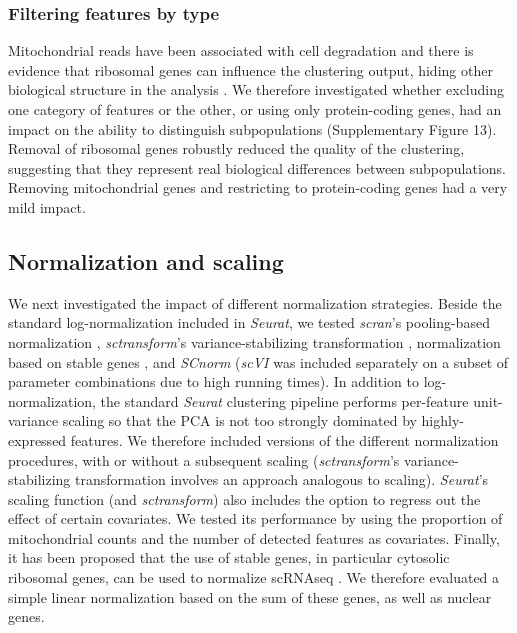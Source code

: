 \documentclass{bmcart}
\begin{document}
\subsubsection*{Filtering features by type}

Mitochondrial reads have been associated with cell degradation and there is evidence that ribosomal genes can influence the clustering output, hiding other biological structure in the analysis \cite{freytagComparison2018}. We therefore investigated whether excluding one category of features or the other, or using only protein-coding genes, had an impact on the ability to distinguish subpopulations (Supplementary Figure 13). Removal of ribosomal genes robustly reduced the quality of the clustering, suggesting that they represent real biological differences between subpopulations. Removing mitochondrial genes and restricting to protein-coding genes had a very mild impact.

\subsection*{Normalization and scaling}

We next investigated the impact of different normalization strategies. Beside the standard log-normalization included in \textit{Seurat}, we tested \textit{scran}'s pooling-based normalization \cite{lunPooling2016}, \textit{sctransform}'s variance-stabilizing transformation \cite{hafemeisterSCtransform2019}, normalization based on stable genes \cite{linStableGenes2018, deekeStablyExpressed2018}, and \textit{SCnorm} \cite{bacherSCnorm2017} (\textit{scVI} \cite{lopezDeep2018} was included separately on a subset of parameter combinations due to high running times). In addition to log-normalization, the standard \textit{Seurat} clustering pipeline performs per-feature unit-variance scaling so that the PCA is not too strongly dominated by highly-expressed features. We therefore included versions of the different normalization procedures, with or without a subsequent scaling (\textit{sctransform}'s variance-stabilizing transformation involves an approach analogous to scaling). 
\textit{Seurat}'s scaling function (and \textit{sctransform}) also includes the option to regress out the effect of certain covariates. We tested its performance by using the proportion of mitochondrial counts and the number of detected features as covariates. Finally, it has been proposed that the use of stable genes, in particular cytosolic ribosomal genes, can be used to normalize scRNAseq \cite{deekeStablyExpressed2018}. We therefore evaluated a simple linear normalization based on the sum of these genes, as well as nuclear genes.
\end{document}
